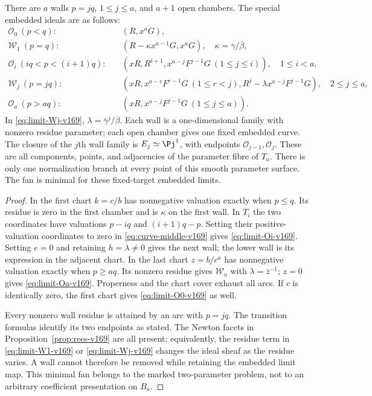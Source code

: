 \begin{theorem}\label{thm:arc-table-v169}
There are $a$ walls $p=jq$, $1\leq j\leq a$, and $a+1$ open chambers.
The special embedded ideals are as follows:
\begin{align}
 \mathcal O_0\ (p<q):\quad& (R,x^aG),\label{eq:limit-O0-v169}\\
 \mathcal W_1\ (p=q):\quad&
       (R-\kappa x^{a-1}G,x^aG),\quad
       \kappa=\overline\gamma/\overline\beta,\label{eq:limit-W1-v169}\\
 \mathcal O_i\ (iq<p<(i+1)q):\quad&
       (xR,R^{i+1},x^{a-j}F^{j-1}G\ (1\leq j\leq i)),
       \quad1\leq i<a,\label{eq:limit-Oi-v169}\\
 \mathcal W_j\ (p=jq):\quad&
       (xR,x^{a-r}F^{r-1}G\ (1\leq r<j),
                   R^j-\lambda x^{a-j}F^{j-1}G),
       \quad2\leq j\leq a,\label{eq:limit-Wj-v169}\\
 \mathcal O_a\ (p>aq):\quad&
       (xR,x^{a-j}F^{j-1}G\ (1\leq j\leq a)).
       \label{eq:limit-Oa-v169}
\end{align}
In \eqref{eq:limit-Wj-v169}, $\lambda=\overline\gamma^j/\overline\beta$.
Each wall is a one-dimensional family with nonzero residue parameter;
each open chamber gives one fixed embedded curve. The closure of the
$j$th wall family is $E_j\simeq\Pj^1$, with endpoints
$\mathcal O_{j-1},\mathcal O_j$. These are all components, points, and
adjacencies of the parameter fibre of $T_a$. There is only one
normalization branch at every point of this smooth parameter surface.
The fan is minimal for these fixed-target embedded limits.
\end{theorem}
\begin{proof}
In the first chart $k=c/b$ has nonnegative valuation exactly when
$p\leq q$. Its residue is zero in the first chamber and is $\kappa$
on the first wall. In $T_i$ the two coordinates have valuations
$p-iq$ and $(i+1)q-p$. Setting their positive-valuation coordinates
to zero in \eqref{eq:curve-middle-v169} gives
\eqref{eq:limit-Oi-v169}. Setting $e=0$ and retaining
$h=\lambda\ne0$ gives the next wall; the lower wall is its expression
in the adjacent chart. In the last chart $z=b/c^a$ has nonnegative
valuation exactly when $p\geq aq$. Its nonzero residue gives
$\mathcal W_a$ with $\lambda=\overline z^{-1}$; $z=0$ gives
\eqref{eq:limit-Oa-v169}. Properness and the chart cover exhaust all
arcs. If $c$ is identically zero, the first chart gives
\eqref{eq:limit-O0-v169} as well.

Every nonzero wall residue is attained by an arc with $p=jq$.
The transition formulas identify its two endpoints as stated. The
Newton facets in Proposition~\ref{prop:rees-v169} are all present;
equivalently, the residue term in \eqref{eq:limit-W1-v169} or
\eqref{eq:limit-Wj-v169} changes the ideal sheaf as the residue varies.
A wall cannot therefore be removed while retaining the embedded limit
map. This minimal fan belongs to the marked two-parameter problem,
not to an arbitrary coefficient presentation on $B_a$.
\end{proof}

